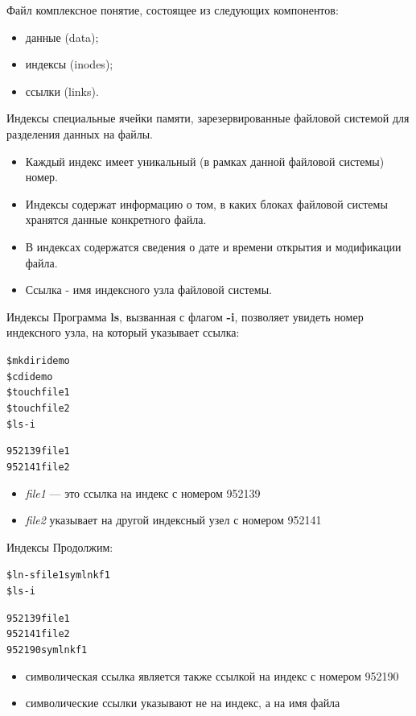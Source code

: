 \documentclass[xcolor=table]{beamer}
\begin{document}
\begin{frame}
	\begin{block}{Файл}
		комплексное понятие, состоящее из следующих компонентов:
		\begin{itemize}
			\item данные (data);
			\item индексы (inodes);
			\item ссылки (links).
		\end{itemize}
	\end{block}
	\begin{block}{Индексы}
		специальные ячейки памяти, зарезервированные файловой системой для разделения данных на файлы. 
	\end{block}
	\begin{itemize}
		\item Каждый индекс имеет уникальный (в рамках данной файловой системы) номер.
		\item Индексы содержат информацию о том, в каких блоках файловой системы хранятся данные конкретного файла. 
		\item В индексах содержатся сведения о дате и времени открытия и модификации файла. 
		\item Ссылка - имя индексного узла файловой системы. 
	\end{itemize}
\end{frame}

\begin{frame}[fragile]{Индексы}
	Программа \textbf{ls}, вызванная с флагом \textbf{-i}, позволяет увидеть номер индексного узла, на который указывает ссылка:
	\begin{alltt}
		\$ mkdir idemo
		\$ cd idemo
		\$ touch file1
		\$ touch file2
		\$ ls -i

		952139 file1 
		952141 file2
	\end{alltt}
	\begin{itemize}
		\item \textit{file1} — это ссылка на индекс с номером 952139 
		\item \textit{file2} указывает на другой индексный узел с номером 952141
	\end{itemize}
\end{frame}

\begin{frame}[fragile]{Индексы}
	Продолжим:
	\begin{alltt}
		\$ ln -s file1 symlnkf1
		\$ ls -i

		952139 file1 
		952141 file2 
		952190 symlnkf1
	\end{alltt}
	\begin{itemize}
		\item символическая ссылка является также ссылкой на индекс с номером 952190
		\item символические ссылки указывают не на индекс, а на имя файла
	\end{itemize}
\end{frame}
\end{document}
